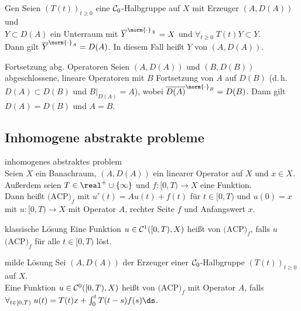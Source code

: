 \begin{Lemma}{Gen}
    Seien $(T(t))_{t \ge 0}$ eine $\mathcal{C}_0$-Halbgruppe auf $X$ mit Erzeuger $(A, D(A))$ und
    \\$Y \subset D(A)$ ein Unterraum mit
    $\overline{Y}^{\norm{\cdot}_X} = X$ und $\forall_{t \ge 0}\; T(t)Y \subset Y$.\\
    Dann gilt $\overline{Y}^{\norm{\cdot}_A} = D(A)$.
    In diesem Fall heißt $Y$  von $(A, D(A))$.
\end{Lemma}

\begin{Lemma}{Fortsetzung abg. Operatoren}
    Seien $(A, D(A))$ und $(B, D(B))$ abgeschlossene, lineare Operatoren
    mit $B$ Fortsetzung von $A$ auf $D(B)$ (d.\,h. $D(A) \subset D(B)$ und $B|_{D(A)} = A$),
    wobei $\overline{D(A)}^{\norm{\cdot}_B} = D(B)$.
    Dann gilt $D(A) = D(B)$ und $A = B$.
\end{Lemma}

\pagebreak

\subsection{%
    Inhomogene abstrakte probleme%
}

\begin{Def}{inhomogenes abstraktes problem}\\
    Seien $X$ ein Banachraum, $(A, D(A))$ ein linearer Operator auf $X$ und $x \in X$.\\
    Außerdem seien $T \in \real^+ \cup \{\infty\}$ und $f\colon [0, T) \to X$ eine Funktion.\\
    Dann heißt $\text{(ACP)}_f$ mit $u'(t) = Au(t) + f(t)$ für $t \in [0, T)$ und $u(0) = x$
    mit $u\colon [0, T) \to X$ 
    mit Operator $A$, rechter Seite $f$ und Anfangswert $x$.
\end{Def}

\begin{Def}{klassische Lösung}
    Eine Funktion $u \in \mathcal{C}^1([0, T), X)$ heißt  von $\text{(ACP)}_f$,
    falls $u$ $\text{(ACP)}_f$ für alle $t \in [0, T)$ löst.
\end{Def}

\begin{Def}{milde Lösung}
    Sei $(A, D(A))$ der Erzeuger einer $\mathcal{C}_0$-Halbgruppe $(T(t))_{t \ge 0}$ auf $X$.\\
    Eine Funktion $u \in \mathcal{C}^0([0, T), X)$ heißt  von $\text{(ACP)}_f$
    mit Operator $A$, falls\\
    $\forall_{t \in [0, T)}\; u(t) = T(t)x + \int_0^t T(t-s) f(s)\ds$.
\end{Def}


